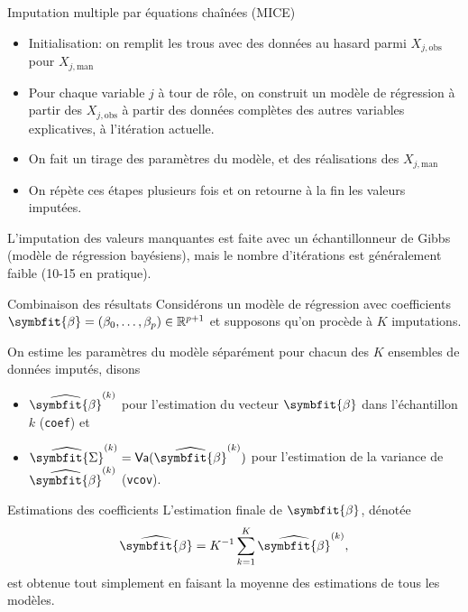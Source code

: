 \documentclass[
  ignorenonframetext,
]{beamer}
\providecommand{\tightlist}{%
  \setlength{\itemsep}{0pt}\setlength{\parskip}{0pt}}\usepackage{longtable,booktabs,array}
\renewcommand{\boldsymbol}[1]{\symbfit{#1}}
\begin{document}
\begin{frame}{Imputation multiple par équations chaînées (MICE)}
\label{imputation-multiple-par-uxe9quations-chauxeenuxe9es-mice}
\begin{itemize}
\tightlist
\item
  Initialisation: on remplit les trous avec des données au hasard parmi
  \(X_{j, \text{obs}}\) pour \(X_{j, \text{man}}\)
\item
  Pour chaque variable \(j\) à tour de rôle, on construit un modèle de
  régression à partir des \(X_{j, \text{obs}}\) à partir des données
  complètes des autres variables explicatives, à l'itération actuelle.
\item
  On fait un tirage des paramètres du modèle, et des réalisations des
  \(X_{j, \text{man}}\)
\item
  On répète ces étapes plusieurs fois et on retourne à la fin les
  valeurs imputées.
\end{itemize}

L'imputation des valeurs manquantes est faite avec un échantillonneur de
Gibbs (modèle de régression bayésiens), mais le nombre d'itérations est
généralement faible (10-15 en pratique).
\end{frame}

\begin{frame}[fragile]{Combinaison des résultats}
\label{combinaison-des-ruxe9sultats}
Considérons un modèle de régression avec coefficients
\(\boldsymbol{\beta} = (\beta_0, \ldots, \beta_p) \in \mathbb{R}^{p+1}\)
et supposons qu'on procède à \(K\) imputations.

On estime les paramètres du modèle séparément pour chacun des \(K\)
ensembles de données imputés, disons

\begin{itemize}
\tightlist
\item
  \(\widehat{\boldsymbol{\beta}}^{(k)}\) pour l'estimation du vecteur
  \(\boldsymbol{\beta}\) dans l'échantillon \(k\) (\texttt{coef}) et
\item
  \(\widehat{\boldsymbol{\Sigma}}^{(k)}=\mathsf{Va}(\widehat{\boldsymbol{\beta}}^{(k)})\)
  pour l'estimation de la variance de
  \(\widehat{\boldsymbol{\beta}}^{(k)}\) (\texttt{vcov}).
\end{itemize}
\end{frame}

\begin{frame}{Estimations des coefficients}
\label{estimations-des-coefficients}
L'estimation finale de \(\boldsymbol{\beta}\), dénotée
\[\widehat{\boldsymbol{\beta}} = K^{-1}\sum_{k=1}^K \widehat{\boldsymbol{\beta}}^{(k)},\]
est obtenue tout simplement en faisant la moyenne des estimations de
tous les modèles.
\end{frame}
\end{document}

